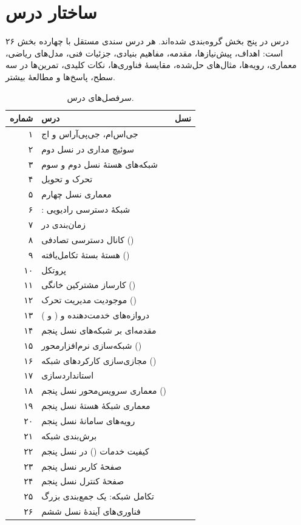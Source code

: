 \documentclass[11pt,a4paper]{article}
\begin{document}
\section{ساختار درس}
۲۶ درس در پنج بخش گروه‌بندی شده‌اند. هر درس سندی مستقل با چهارده بخش است: اهداف، پیش‌نیازها، مقدمه، مفاهیم بنیادی، جزئیات فنی، مدل‌های ریاضی،
معماری، رویه‌ها، مثال‌های حل‌شده، مقایسهٔ فناوری‌ها، نکات کلیدی، تمرین‌ها در سه سطح، پاسخ‌ها و مطالعهٔ بیشتر.

\begin{table}[htbp]
\centering\small
\caption{سرفصل‌های درس.}\label{tab:modules}
\begin{tabularx}{\linewidth}{@{}r Y l@{}}
\toprule
{} شماره & درس & نسل \\
\midrule
۱ & جی‌اس‌ام، جی‌پی‌آر‌اس و اج &  \\
۲ & سوئیچ مداری در نسل دوم &  \\
۳ & شبکه‌های هستهٔ نسل دوم و سوم &  \\
۴ & تحرک و تحویل &  \\
۵ & معماری  نسل چهارم &  \\
۶ & : شبکهٔ دسترسی رادیویی  &  \\
۷ & زمان‌بندی در  &  \\
۸ & کانال دسترسی تصادفی () &  \\
۹ & هستهٔ بستهٔ تکامل‌یافته () &  \\
۱۰ & پروتکل  &  \\
۱۱ & کارساز مشترکین خانگی () &  \\
۱۲ & موجودیت مدیریت تحرک () &  \\
۱۳ & دروازه‌های خدمت‌دهنده و  ( و ) &  \\
۱۴ & مقدمه‌ای بر شبکه‌های نسل پنجم &  \\
۱۵ & شبکه‌سازی نرم‌افزارمحور () &  \\
۱۶ & مجازی‌سازی کارکردهای شبکه () &  \\
۱۷ & استانداردسازی  &  \\
۱۸ & معماری سرویس‌محور نسل پنجم () &  \\
۱۹ & معماری شبکهٔ هستهٔ نسل پنجم &  \\
۲۰ & رویه‌های سامانهٔ نسل پنجم &  \\
۲۱ & برش‌بندی شبکه &  \\
۲۲ & کیفیت خدمات () در نسل پنجم &  \\
۲۳ & صفحهٔ کاربر نسل پنجم &  \\
۲۴ & صفحهٔ کنترل نسل پنجم &  \\
۲۵ & تکامل شبکه: یک جمع‌بندی بزرگ &  \\
۲۶ & فناوری‌های آیندهٔ نسل ششم &  \\
\bottomrule
\end{tabularx}
\end{table}
\end{document}
